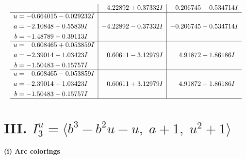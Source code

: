 \documentclass[1p]{elsarticle_modified}
\theoremstyle{definition}
\begin{document}
$$\begin{array}{c|c|c}
 & -4.22892 + 0.37332 I & -0.206745 + 0.534714 I \\ \hline\begin{aligned}
u &= -0.664015 - 0.029232 I \\
a &= -2.10848 + 0.55839 I \\
b &= -1.48789 - 0.39113 I\end{aligned}
 & -4.22892 - 0.37332 I & -0.206745 - 0.534714 I \\ \hline\begin{aligned}
u &= \phantom{-}0.608465 + 0.053859 I \\
a &= -2.39014 - 1.03423 I \\
b &= -1.50483 + 0.15757 I\end{aligned}
 & \phantom{-}0.60611 - 3.12979 I & \phantom{-}4.91872 + 1.86186 I \\ \hline\begin{aligned}
u &= \phantom{-}0.608465 - 0.053859 I \\
a &= -2.39014 + 1.03423 I \\
b &= -1.50483 - 0.15757 I\end{aligned}
 & \phantom{-}0.60611 + 3.12979 I & \phantom{-}4.91872 - 1.86186 I\\
 \hline 
 \end{array}$$\newpage\newpage\renewcommand{\arraystretch}{1}
\centering \section*{III. $I^u_{3}= \langle b^3- b^2 u- u,\;a+1,\;u^2+1 \rangle$}
\flushleft \textbf{(i) Arc colorings}\\
\end{document}
